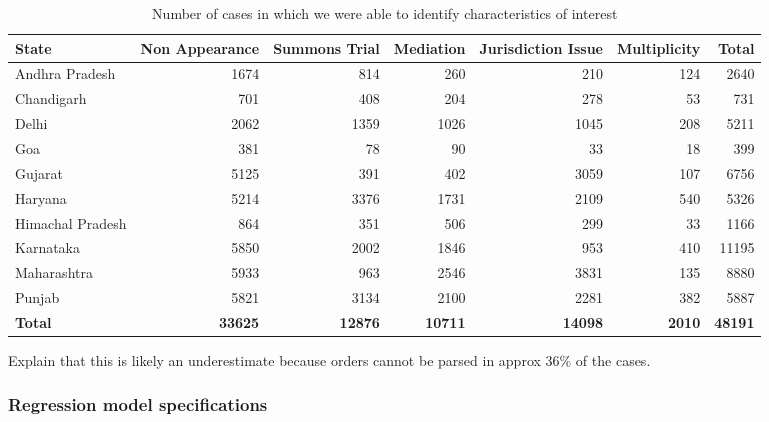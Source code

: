 \begin{longtable}{@{}lrrrrrr@{}}
\caption{Number of cases in which we were able to identify characteristics of interest}
\label{tab:case_chars}\\
\textbf{State} & \textbf{Non Appearance} & \textbf{Summons Trial} & \textbf{Mediation} & \textbf{Jurisdiction Issue} & \textbf{Multiplicity} & \textbf{Total} \\
\endhead
Andhra Pradesh & 1674 & 814 & 260 & 210 & 124 & 2640 \\
Chandigarh & 701 & 408 & 204 & 278 & 53 & 731 \\
Delhi & 2062 & 1359 & 1026 & 1045 & 208 & 5211 \\
Goa & 381 & 78 & 90 & 33 & 18 & 399 \\
Gujarat & 5125 & 391 & 402 & 3059 & 107 & 6756 \\
Haryana & 5214 & 3376 & 1731 & 2109 & 540 & 5326 \\
Himachal Pradesh & 864 & 351 & 506 & 299 & 33 & 1166 \\
Karnataka & 5850 & 2002 & 1846 & 953 & 410 & 11195 \\
Maharashtra & 5933 & 963 & 2546 & 3831 & 135 & 8880 \\
Punjab & 5821 & 3134 & 2100 & 2281 & 382 & 5887 \\
\textbf{Total} & \textbf{33625} & \textbf{12876} & \textbf{10711} & \textbf{14098} & \textbf{2010} & \textbf{48191}
\end{longtable}

Explain that this is likely an underestimate because orders cannot be parsed in approx 36\% of the cases.

\subsubsection{Regression model specifications}
\label{sec:model-selection}


